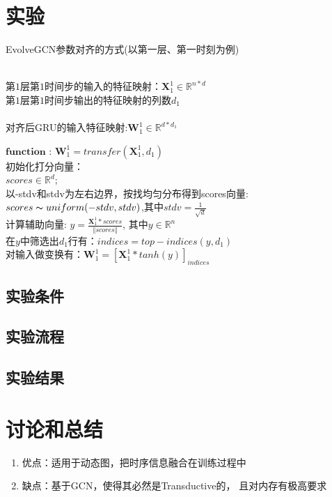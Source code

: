 \chapter{实验} \label{chpt:D}
  \begin{algorithm}[htbp]
    \caption{EvolveGCN参数对齐的方式(以第一层、第一时刻为例)}
    \label{alg:GCN-process}
    \hspace*{0.04in}{\bf Inputs:}\\
    第$1$层第$1$时间步的输入的特征映射：$\mathbf{X}_{1}^{1} \in \mathbb{R}^{n*d}$ \\
    第$1$层第$1$时间步输出的特征映射的列数$d_1$ \\
    \hspace*{0.04in}{\bf Outputs:}\\ 
    对齐后GRU的输入特征映射:$\mathbf{W}_{1}^{1} \in \mathbb{R}^{d*d_1}$
    \begin{algorithmic}[1]
      \State $\textbf{function}$ : $\mathbf{W}_{1}^{1}  = transfer(\mathbf{X}_{1}^{1}, d_1)$\\
      初始化打分向量：\\ $scores \in \mathbb{R}^{d}$; \\
      以-stdv和stdv为左右边界，按找均匀分布得到scores向量:\\$scores \thicksim uniform(-stdv, stdv)$,其中$stdv = \frac{1}{\sqrt{d}}$ \\
      计算辅助向量: $y = \frac{\mathbf{X}_1^1 * scores}{\Vert scores \Vert} $, 其中$y \in \mathbb{R}^{n}$\\
      在$y$中筛选出$d_1$行有：$indices = top-indices(y, d_1)$ \\
      对输入做变换有：$\mathbf{W}_1^1 ={[ \mathbf{X}_1^1 * tanh(y)]}_{indices}$
    \end{algorithmic}
  \end{algorithm}
  \section{实验条件}
  \section{实验流程}
  \section{实验结果}

\chapter{讨论和总结} \label{chpt:E}
\begin{enumerate}
    \item 优点：适用于动态图，把时序信息融合在训练过程中
    \item 缺点：基于GCN，使得其必然是Transductive的，
    且对内存有极高要求
\end{enumerate}

  